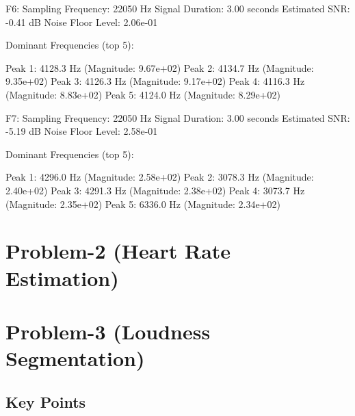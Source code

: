 \documentclass[a4paper,12pt]{article}
\begin{document}
F6:
Sampling Frequency: 22050 Hz
Signal Duration: 3.00 seconds
Estimated SNR: -0.41 dB
Noise Floor Level: 2.06e-01

Dominant Frequencies (top 5):

Peak 1: 4128.3 Hz (Magnitude: 9.67e+02)
Peak 2: 4134.7 Hz (Magnitude: 9.35e+02)
Peak 3: 4126.3 Hz (Magnitude: 9.17e+02)
Peak 4: 4116.3 Hz (Magnitude: 8.83e+02)
Peak 5: 4124.0 Hz (Magnitude: 8.29e+02)

F7:
Sampling Frequency: 22050 Hz
Signal Duration: 3.00 seconds
Estimated SNR: -5.19 dB
Noise Floor Level: 2.58e-01

Dominant Frequencies (top 5):

Peak 1: 4296.0 Hz (Magnitude: 2.58e+02)
Peak 2: 3078.3 Hz (Magnitude: 2.40e+02)
Peak 3: 4291.3 Hz (Magnitude: 2.38e+02)
Peak 4: 3073.7 Hz (Magnitude: 2.35e+02)
Peak 5: 6336.0 Hz (Magnitude: 2.34e+02)
\section*{Problem-2 (Heart Rate Estimation)}

\section*{Problem-3 (Loudness Segmentation)}
\subsection*{Key Points}
\end{document}
